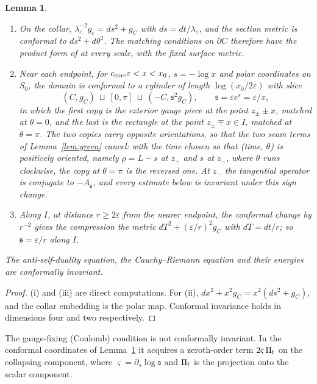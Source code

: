 \documentclass[11pt]{amsart}
\newtheorem{lemma}[theorem]{Lemma}
\theoremstyle{definition}
\theoremstyle{remark}
\theoremstyle{plain}
\numberwithin{equation}{section}
\newcommand{\eps}{\varepsilon}
\begin{document}
\begin{lemma}\label{lem:conformal-models}
\begin{enumerate}[label=(\roman*)]
\item On the collar, $\lambda_\eps^{-2}g_\eps=ds^2+g_C$ with
  $ds=dt/\lambda_\eps$, and the section metric is conformal to
  $ds^2+d\theta^2$. The matching conditions on $\partial C$ therefore have
  the product form of \cite[Section~3.1]{DFL} at every scale, with the fixed
  surface metric.
\item Near each endpoint, for $c_{\rm core}\eps<x<x_0$, $s=-\log x$ and polar
  coordinates on $S_0$, the domain is conformal to a cylinder of length
  $\log(x_0/2\eps)$ with slice
  \[
  (C,g_C)\ \sqcup\ [0,\pi]\ \sqcup\ (-C,{\mathfrak s}^2g_C),\qquad
  {\mathfrak s}=\eps e^{s}=\eps/x,
  \]
  in which the first copy is the exterior gauge piece at the point
  $z_\pm\pm x$, matched at $\theta=0$, and the last is the rectangle at the
  point $z_\pm\mp x\in I$, matched at $\theta=\pi$. The two copies carry opposite
  orientations, so that the two seam terms of Lemma~\ref{lem:green} cancel: with the
  time chosen so that (time, $\theta$) is positively oriented, namely $\rho=L-s$ at $z_+$
  and $s$ at $z_-$, where $\theta$ runs clockwise, the copy at $\theta=\pi$ is the reversed
  one. At $z_-$ the tangential operator is conjugate to $-A_{\mathfrak s}$, and every
  estimate below is invariant under this sign change.
\item Along $I$, at distance $r\ge2\eps$ from the nearer endpoint, the
  conformal change by $r^{-2}$ gives the compression the metric
  $dT^2+(\eps/r)^2g_C$ with $dT=dt/r$; so ${\mathfrak s}=\eps/r$ along $I$.
\end{enumerate}
The anti-self-duality equation, the Cauchy--Riemann equation and their
energies are conformally invariant.
\end{lemma}

\begin{proof}
(i) and (iii) are direct computations. For (ii), $dx^2+x^2g_C=
x^2(ds^2+g_C)$, and the collar embedding is the polar map. Conformal
invariance holds in dimensions four and two respectively.
\end{proof}

The gauge-fixing (Coulomb) condition is not conformally invariant. In
the conformal coordinates of Lemma~\ref{lem:conformal-models} it
acquires a zeroth-order term $2\varsigma\,\Pi_{\rm f}$ on the collapsing component,
where $\varsigma=\partial_s\log{\mathfrak s}$ and $\Pi_{\rm f}$ is the projection onto the
scalar component.
\end{document}
